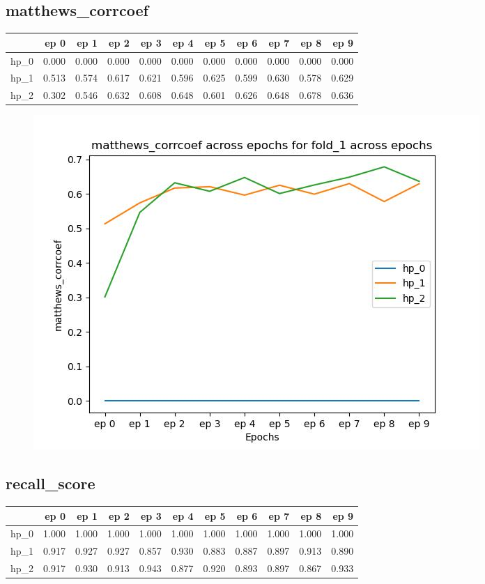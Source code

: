 \documentclass{article}
\begin{document}
\subsection{matthews\_corrcoef}
\begin{tabular}{lrrrrrrrrrr}
\toprule
{} &   ep 0 &   ep 1 &   ep 2 &   ep 3 &   ep 4 &   ep 5 &   ep 6 &   ep 7 &   ep 8 &   ep 9 \\
\midrule
hp\_0 &  0.000 &  0.000 &  0.000 &  0.000 &  0.000 &  0.000 &  0.000 &  0.000 &  0.000 &  0.000 \\
hp\_1 &  0.513 &  0.574 &  0.617 &  0.621 &  0.596 &  0.625 &  0.599 &  0.630 &  0.578 &  0.629 \\
hp\_2 &  0.302 &  0.546 &  0.632 &  0.608 &  0.648 &  0.601 &  0.626 &  0.648 &  0.678 &  0.636 \\
\bottomrule
\end{tabular}

\begin{figure}[H]
\includegraphics[scale = 0.75]{fold_1/matthews_corrcoef}
\end{figure}
\subsection{recall\_score}
\begin{tabular}{lrrrrrrrrrr}
\toprule
{} &   ep 0 &   ep 1 &   ep 2 &   ep 3 &   ep 4 &   ep 5 &   ep 6 &   ep 7 &   ep 8 &   ep 9 \\
\midrule
hp\_0 &  1.000 &  1.000 &  1.000 &  1.000 &  1.000 &  1.000 &  1.000 &  1.000 &  1.000 &  1.000 \\
hp\_1 &  0.917 &  0.927 &  0.927 &  0.857 &  0.930 &  0.883 &  0.887 &  0.897 &  0.913 &  0.890 \\
hp\_2 &  0.917 &  0.930 &  0.913 &  0.943 &  0.877 &  0.920 &  0.893 &  0.897 &  0.867 &  0.933 \\
\bottomrule
\end{tabular}
\end{document}
